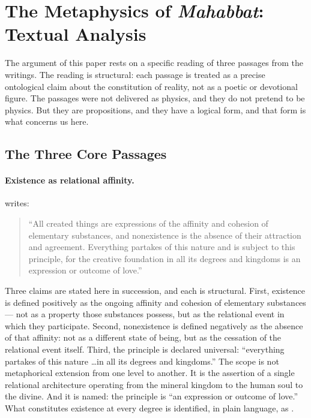 
\section{The \bahai Metaphysics of \textit{Mahabbat}: Textual Analysis}
\label{sec:mahabbat}


The argument of this paper rests on a specific reading of three passages from
the \bahai writings.
The reading is structural: each passage is treated as a precise ontological
claim about the constitution of reality, not as a poetic or devotional figure.
The passages were not delivered as physics, and they do not pretend to be physics.
But they are propositions, and they have a logical form, and that form is
what concerns us here.

\subsection{The Three Core Passages}

\paragraph{Existence as relational affinity.}
\AbdulBaha writes:
\begin{quote}
``All created things are expressions of the affinity and cohesion of
elementary substances, and nonexistence is the absence of their
attraction and agreement. Everything partakes of this nature and is
subject to this principle, for the creative foundation in all its
degrees and kingdoms is an expression or outcome of love.''
\citep[Talk 47]{PUP}
\end{quote}

Three claims are stated here in succession, and each is structural.
First, existence is defined positively as the ongoing affinity and cohesion of
elementary substances --- not as a property those substances possess, but as the
relational event in which they participate.
Second, nonexistence is defined negatively as the absence of that affinity:
not as a different state of being, but as the cessation of the relational event
itself.
Third, the principle is declared universal: ``everything partakes of this
nature \ldots in all its degrees and kingdoms.''
The scope is not metaphorical extension from one level to another.
It is the assertion of a single relational architecture operating from the
mineral kingdom to the human soul to the divine.
And it is named: the principle is ``an expression or outcome of love.''
What constitutes existence at every degree is identified, in plain language,
as \mahabbat.

